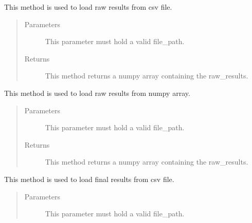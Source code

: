 \documentclass[letterpaper,10pt,english,openany,oneside]{sphinxmanual}
\begin{document}
\begin{fulllineitems}
\begin{fulllineitems}
\label{\detokenize{Evaluation:sbd.Evaluation.Evaluation.loadRawResultsFromCsv}}
This method is used to load raw results from csv file.
\begin{quote}\begin{description}
\item[{Parameters}] \leavevmode
{} \textendash{} This parameter must hold a valid file\_path.

\item[{Returns}] \leavevmode
This method returns a numpy array containing the raw\_results.

\end{description}\end{quote}

\end{fulllineitems}


\begin{fulllineitems}
\label{\detokenize{Evaluation:sbd.Evaluation.Evaluation.loadRawResultsFromNumpy}}
This method is used to load raw results from numpy array.
\begin{quote}\begin{description}
\item[{Parameters}] \leavevmode
{} \textendash{} This parameter must hold a valid file\_path.

\item[{Returns}] \leavevmode
This method returns a numpy array containing the raw\_results.

\end{description}\end{quote}

\end{fulllineitems}


\begin{fulllineitems}
\label{\detokenize{Evaluation:sbd.Evaluation.Evaluation.loadResultsFromCSV}}
This method is used to load final results from csv file.
\begin{quote}\begin{description}
\item[{Parameters}] \leavevmode
{} \textendash{} This parameter must hold a valid file\_path.


\end{description}
\end{quote}
\end{fulllineitems}
\end{fulllineitems}
\end{document}
